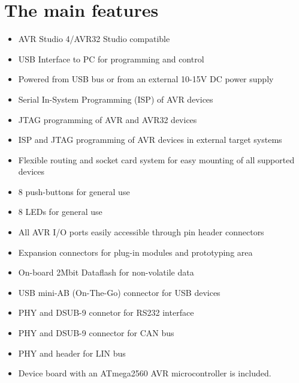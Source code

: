 \documentclass[english]{article}
\begin{document}
\section{The main features}
\begin{itemize}
\item AVR Studio 4/AVR32 Studio compatible

\item USB Interface to PC for programming and control

\item Powered from USB bus or from an external 10-15V DC power supply

\item Serial In-System Programming (ISP) of AVR devices

\item JTAG programming of AVR and AVR32 devices

\item ISP and JTAG programming of AVR devices in external target systems

\item Flexible routing and socket card system for easy mounting of all supported devices

\item 8 push-buttons for general use

\item 8 LEDs for general use

\item All AVR I/O ports easily accessible through pin header connectors

\item Expansion connectors for plug-in modules and prototyping area

\item On-board 2Mbit Dataflash for non-volatile data

\item USB mini-AB (On-The-Go) connector for USB devices

\item PHY and DSUB-9 connetor for RS232 interface

\item PHY and DSUB-9 connector for CAN bus

\item PHY and header for LIN bus

\item Device board with an ATmega2560 AVR microcontroller is included. 

\end{itemize}
\end{document}
